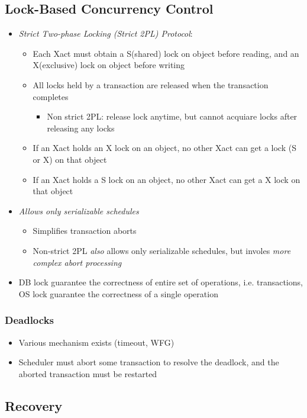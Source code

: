   \subsection{Lock-Based Concurrency Control}

    \begin{itemize}
      \item \emph{Strict Two-phase Locking (Strict 2PL) Protocol}:
      \begin{itemize}
        \item Each Xact must obtain a S(shared) lock on object before reading,
        and an X(exclusive) lock on object before writing
        \item All locks held by a transaction are released when the transaction
        completes
        \begin{itemize}
          \item Non strict 2PL: release lock anytime, but cannot acquiare locks
          after releasing any locks
        \end{itemize}

        \item If an Xact holds an X lock on an object, no other Xact
        can get a lock (S or X) on that object
        \item If an Xact holds a S lock on an object, no other Xact can get a
        X lock on that object
      \end{itemize}

      \item \emph{Allows only serializable schedules}
      \begin{itemize}
        \item Simplifies transaction aborts
        \item Non-strict 2PL \emph{also} allows only serializable schedules,
        but involes \emph{more complex abort processing}
      \end{itemize}

      \item DB lock guarantee the correctness of entire set of operations, i.e.
      transactions, OS lock guarantee the correctness of a single operation
    \end{itemize}

    \subsubsection{Deadlocks}

      \begin{itemize}
        \item Various mechanism exists (timeout, WFG)
        \item Scheduler must abort some transaction to resolve the deadlock,
        and the aborted transaction must be restarted
      \end{itemize}

    \subsection{Recovery}
